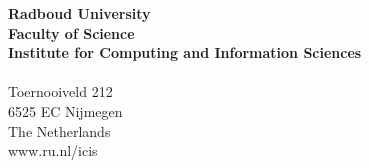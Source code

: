 \thispagestyle{empty} %
\frieze




\vspace*{\fill}
\noindent
\sffamily
\small
\textbf{Radboud University} \hfill \textbf{}\\
\textbf{Faculty of Science} \hfill \textbf{}\\
\textbf{Institute for Computing and Information Sciences} \hfill \textbf{}\\
\\
Toernooiveld 212 \hfill \\
6525 EC Nijmegen \hfill\\
The Netherlands \hfill\\
www.ru.nl/icis\hfill
\normalsize
\normalfont
\vspace*{2.5cm}
